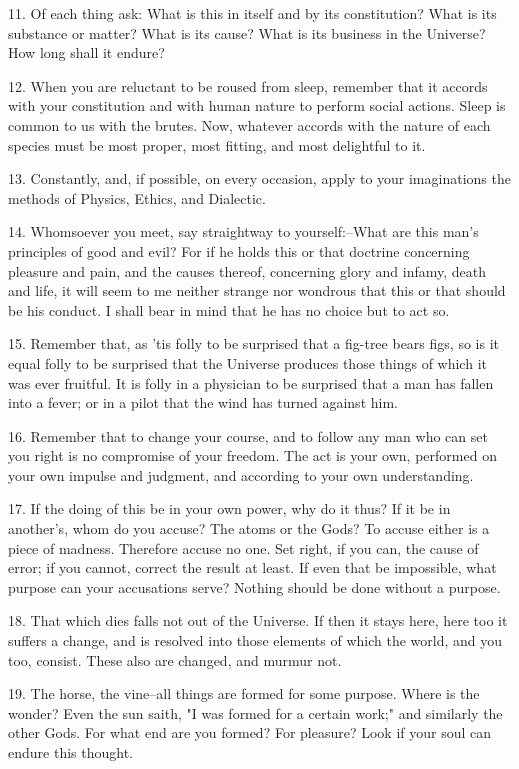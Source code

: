 \documentclass{book}
\begin{document}
11. Of each thing ask: What is this in itself and by its constitution?
What is its substance or matter? What is its cause? What is its
business in the Universe? How long shall it endure?

\newpage

12. When you are reluctant to be roused from sleep, remember that it
accords with your constitution and with human nature to perform social
actions. Sleep is common to us with the brutes. Now, whatever accords
with the nature of each species must be most proper, most fitting, and
most delightful to it.

13. Constantly, and, if possible, on every occasion, apply to your
imaginations the methods of Physics, Ethics, and Dialectic.

14. Whomsoever you meet, say straightway to yourself:--What are this
man's principles of good and evil? For if he holds this or that
doctrine concerning pleasure and pain, and the causes thereof,
concerning glory and infamy, death and life, it will seem to me
neither strange nor wondrous that this or that should be his
conduct. I shall bear in mind that he has no choice but to act so.

15. Remember that, as 'tis folly to be surprised that a fig-tree bears
figs, so is it equal folly to be surprised that the Universe produces
those things of which it was ever fruitful. It is folly in a physician
to be surprised that a man has fallen into a fever; or in a pilot that
the wind has turned against him.

16. Remember that to change your course, and to follow any man who can
set you right is no compromise of your freedom. The act is your own,
performed on your own impulse and judgment, and according to your own
understanding.

17. If the doing of this be in your own power, why do it thus? If it
be in another's, whom do you accuse? The atoms or the Gods? To accuse
either is a piece of madness. Therefore accuse no one. Set right, if
you can, the cause of error; if you cannot, correct the result at
least. If even that be impossible, what purpose can your accusations
serve?  Nothing should be done without a purpose.

18. That which dies falls not out of the Universe. If then it stays
here, here too it suffers a change, and is resolved into those
elements of which the world, and you too, consist. These also are
changed, and murmur not.

19. The horse, the vine--all things are formed for some purpose. Where
is the wonder? Even the sun saith, "I was formed for a certain work;"
and similarly the other Gods. For what end are you formed? For
pleasure?  Look if your soul can endure this thought.
\end{document}
